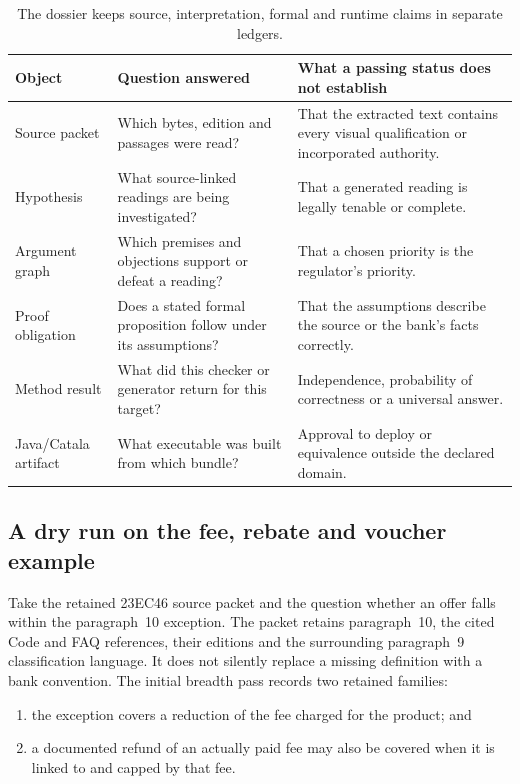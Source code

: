 \documentclass[12pt,a4paper,oneside,openany]{book}
\begin{document}
\begin{table}[H]
\centering\small
\begin{tabularx}{\textwidth}{P{0.19\textwidth}Y Y}
\toprule
Object & Question answered & What a passing status does not establish \\
\midrule
Source packet & Which bytes, edition and passages were read? & That the extracted text contains every visual qualification or incorporated authority. \\
Hypothesis & What source-linked readings are being investigated? & That a generated reading is legally tenable or complete. \\
Argument graph & Which premises and objections support or defeat a reading? & That a chosen priority is the regulator's priority. \\
Proof obligation & Does a stated formal proposition follow under its assumptions? & That the assumptions describe the source or the bank's facts correctly. \\
Method result & What did this checker or generator return for this target? & Independence, probability of correctness or a universal answer. \\
Java/Catala artifact & What executable was built from which bundle? & Approval to deploy or equivalence outside the declared domain. \\
\bottomrule
\end{tabularx}
\caption{The dossier keeps source, interpretation, formal and runtime claims in separate ledgers.}
\label{tab:proof-carrying-boundaries}
\end{table}

\subsection{A dry run on the fee, rebate and voucher example}

Take the retained 23EC46 source packet and the question whether an offer falls
within the paragraph~10 exception. The packet retains paragraph~10, the cited
Code and FAQ references, their editions and the surrounding paragraph~9
classification language. It does not silently replace a missing definition
with a bank convention. The initial breadth pass records two retained families:

\begin{enumerate}
\item the exception covers a reduction of the fee charged for the product; and
\item a documented refund of an actually paid fee may also be covered when it
      is linked to and capped by that fee.
\end{enumerate}
\end{document}
